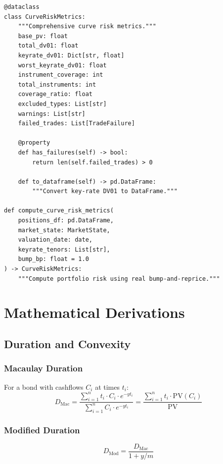 \documentclass[12pt,a4paper]{report}
\newcommand{\pv}{\text{PV}}
\begin{document}
\begin{lstlisting}
@dataclass
class CurveRiskMetrics:
    """Comprehensive curve risk metrics."""
    base_pv: float
    total_dv01: float
    keyrate_dv01: Dict[str, float]
    worst_keyrate_dv01: float
    instrument_coverage: int
    total_instruments: int
    coverage_ratio: float
    excluded_types: List[str]
    warnings: List[str]
    failed_trades: List[TradeFailure]
    
    @property
    def has_failures(self) -> bool:
        return len(self.failed_trades) > 0
    
    def to_dataframe(self) -> pd.DataFrame:
        """Convert key-rate DV01 to DataFrame."""

def compute_curve_risk_metrics(
    positions_df: pd.DataFrame,
    market_state: MarketState,
    valuation_date: date,
    keyrate_tenors: List[str],
    bump_bp: float = 1.0
) -> CurveRiskMetrics:
    """Compute portfolio risk using real bump-and-reprice."""
\end{lstlisting}

\appendix

\chapter{Mathematical Derivations}

\section{Duration and Convexity}

\subsection{Macaulay Duration}

For a bond with cashflows $C_i$ at times $t_i$:
\begin{equation}
    D_{\text{Mac}} = \frac{\sum_{i=1}^{n} t_i \cdot C_i \cdot e^{-y t_i}}{\sum_{i=1}^{n} C_i \cdot e^{-y t_i}} = \frac{\sum_{i=1}^{n} t_i \cdot \pv(C_i)}{\pv}
\end{equation}

\subsection{Modified Duration}

\begin{equation}
    D_{\text{Mod}} = \frac{D_{\text{Mac}}}{1 + y/m}
\end{equation}
\end{document}

